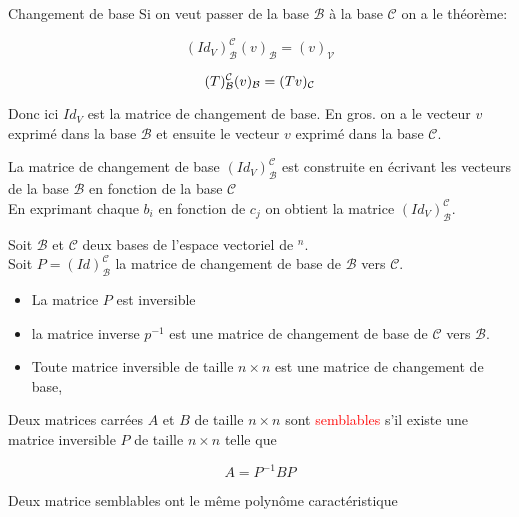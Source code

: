 \begin{parag}{Changement de base}
    Si on veut passer de la base $\mathcal{B}$ à la base $\mathcal{C}$ on a le théorème:
    \begin{truc}
        \[(Id_V)_{\mathcal{B}}^\mathcal{C}(v)_{\mathcal{B}} = (v)_{\mathcal{V}}\]
    \end{truc}
    \begin{theoreme}
        \[(T)_{\mathcal{B}}^{\mathcal{C}} (v)_{\mathcal{B}} = (Tv)_{\mathcal{C}}\]
    \end{theoreme}
    Donc ici $Id_V$ est la matrice de changement de base. En gros. on a le vecteur $v$ exprimé dans la base $\mathcal{B}$ et ensuite le vecteur $v$ exprimé dans la base $\mathcal{C}$.
    \begin{truc}
        La matrice de changement de base $(Id_V)_{\mathcal{B}}^\mathcal{C}$ est construite en écrivant les vecteurs de la base $\mathcal{B}$ en fonction de la base $\mathcal{C}$\\
        En exprimant chaque $b_i$ en fonction de $c_j$ on obtient la matrice $(Id_V)_{\mathcal{B}}^\mathcal{C}$.
    \end{truc}
    \begin{truc}
        Soit $\mathcal{B}$ et $\mathcal{C}$ deux bases de l'espace vectoriel de \R$^n$.\\
        Soit $P = (Id)_{\mathcal{B}}^{\mathcal{C}}$ la matrice de changement de base de $\mathcal{B}$ vers $\mathcal{C}$.
        \begin{itemize}
            \item La matrice $P$ est inversible
            \item la matrice inverse $p^{-1}$ est une matrice de changement de base de $\mathcal{C}$ vers $\mathcal{B}$.
            \item Toute matrice inversible de taille $n \times n$ est une matrice de changement de base,
        \end{itemize}
    \end{truc}
    \begin{definition}
        Deux matrices carrées $A$ et $B$ de taille $n \times n$ sont \textcolor{red}{semblables} s'il existe une matrice inversible $P$ de taille $n \times n$ telle que 
        \begin{formule}
            \[A = P^{-1}BP\]
        \end{formule}
    \end{definition}
    \begin{truc}
        Deux matrice semblables ont le même polynôme caractéristique

\end{truc}
\end{parag}
